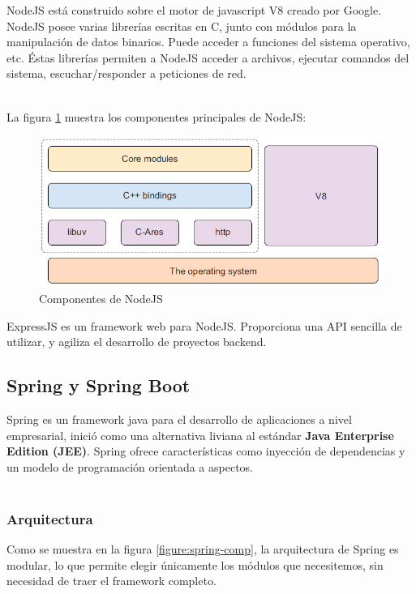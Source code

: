 		NodeJS está construido sobre el motor de javascript V8 creado por Google.
		NodeJS posee varias librerías escritas en C, junto con módulos para la
		manipulación de datos binarios. Puede acceder a funciones del sistema
		operativo, etc. Éstas librerías permiten a NodeJS acceder a archivos, ejecutar
		comandos del sistema, escuchar/responder a peticiones de red.\\\
		
		La figura \ref{figure:nodejs-comp} muestra los componentes principales de
		NodeJS:
		
		\begin{figure}[H]
		    \centering
			\includegraphics[width=16cm]{../imgs/ejemplos/nodejs-comp.png}
			\caption{Componentes de NodeJS}
			\label{figure:nodejs-comp}
		\end{figure}
		
		
		
		ExpressJS es un framework web para NodeJS. Proporciona una API sencilla de
		utilizar, y agiliza el desarrollo de proyectos backend.
	\newpage
	
	\subsection{Spring y Spring Boot}
		Spring es un framework java para el desarrollo de aplicaciones a nivel
		empresarial, inició como una alternativa liviana al estándar {\bf Java
		Enterprise Edition (JEE)}. Spring ofrece características como inyección de
		dependencias y un modelo de programación orientada a aspectos.\\\
		
		\subsubsection{Arquitectura}
			Como se muestra en la figura \ref{figure:spring-comp}, la arquitectura de
			Spring es modular, lo que permite elegir únicamente los módulos que
			necesitemos, sin necesidad de traer el framework completo.
		
